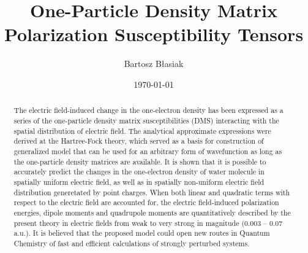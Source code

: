 \documentclass[aip,amsmath,amssymb,reprint,floatfix]{revtex4-1}
\begin{document}

\title{One-Particle Density Matrix Polarization Susceptibility Tensors}

\author{Bartosz B{\l}asiak}

\date{\today}

\begin{abstract}


The electric field\hyp{}induced change in the one\hyp{}electron density
has been expressed as a series of the one\hyp{}particle density matrix susceptibilities (DMS)
interacting with the spatial distribution of electric field.
The analytical approximate expressions were derived
at the Hartree\hyp{}Fock theory, which served as a basis for construction of generalized
model that can be used for an arbitrary form of wavefunction as long as the one\hyp{}particle
density matrices are available. It is shown that it is possible to accurately predict the changes
in the one\hyp{}electron density of water molecule in spatially uniform electric field, as well as
in spatially non\hyp{}uniform electric field distribution
generetated by point charges. When both linear and quadratic terms with respect to the electric field 
are accounted for,
the electric field\hyp{}induced polarization energies,
dipole moments and quadrupole moments are quantitatively described by the present theory 
in electric fields from weak to very strong in magnitude (0.003 -- 0.07 a.u.).
It is believed that the proposed model could open
new routes in Quantum Chemistry of fast and efficient calculations of strongly perturbed systems.
\end{abstract}

\pacs{}%

\maketitle %
\end{document}
